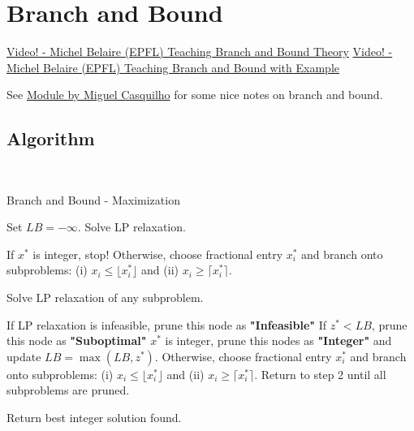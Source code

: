 \section{Branch and Bound}
\begin{resource}
\href{https://www.youtube.com/watch?v=SdXPNaID-T8}{Video! -  Michel Belaire (EPFL) Teaching Branch and Bound Theory}
\href{https://www.youtube.com/watch?v=nKXZYQUtvAY}{Video! -  Michel Belaire (EPFL) Teaching Branch and Bound with Example}

See \href{http://web.tecnico.ulisboa.pt/mcasquilho/compute/_linpro/TaylorB_module_c.pdf}{Module by Miguel Casquilho} for some nice notes on branch and bound.
\end{resource}

\subsection{Algorithm}


\begin{algorithm}[H]
\\
\caption{Branch and Bound - Maximization}\label{alg:branch-and-bound-max}
\begin{algorithmic}[1]
	\State Set $LB = - \infty$.
 	\State Solve LP relaxation. 
	\begin{algsubstates}
        		\State If $x^*$ is integer, stop!
        		\State Otherwise, choose fractional entry $x_i^*$ and branch onto subproblems:
		(i) $x_i \leq \lfloor x^*_i \rfloor$ and 
		(ii) $x_i \geq \lceil x^*_i \rceil$.    
	   \end{algsubstates}
	\State Solve LP relaxation of any subproblem.
		\begin{algsubstates}
		\State If LP relaxation is infeasible, prune this node as \textbf{"Infeasible"}
        		\State If $z^* < LB$, prune this node as \textbf{"Suboptimal"}
		\State $x^*$ is integer, prune this nodes as \textbf{"Integer"} and update $LB = \max(LB, z^*)$.
		\State Otherwise, choose fractional entry $x_i^*$ and branch onto subproblems:  (i) $x_i \leq \lfloor x^*_i \rfloor$ and (ii) $x_i \geq \lceil x^*_i \rceil$.     Return to step 2 until all subproblems are pruned.
      \end{algsubstates}
      \State Return best integer solution found.
	\end{algorithmic}
\end{algorithm}

